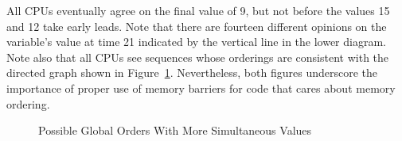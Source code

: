 All CPUs eventually agree on the final value of 9, but not before
the values 15 and 12 take early leads.
Note that there are fourteen different opinions on the variable's value
at time 21 indicated by the vertical line in the lower diagram.
Note also that all CPUs see sequences whose orderings are consistent with
the directed graph shown in
Figure~\ref{fig:advsync:Possible Global Orders With More Simultaneous Values}.
Nevertheless, both figures underscore the importance of
proper use of memory barriers for code that cares about memory ordering.
\fi

\begin{figure}[htb]
\begin{center}
\end{center}
\caption{Possible Global Orders With More Simultaneous Values}
\label{fig:advsync:Possible Global Orders With More Simultaneous Values}
\end{figure}

